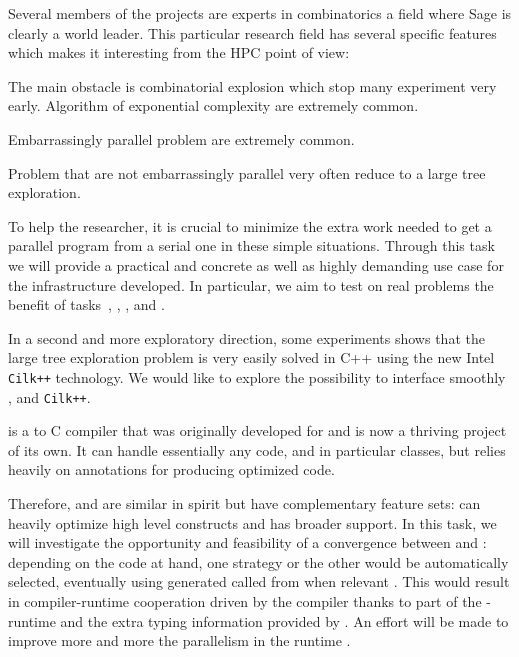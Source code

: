 \begin{workpackage}
\begin{tasklist}
\begin{task}[title=HPC infrastructure for combinatorics,id=hpc-combi]
  Several members of the projects are experts in combinatorics a field where
  Sage is clearly a world leader. This particular research field has several
  specific features which makes it interesting from the HPC point of view:
  \begin{compactitem}
  \item The main obstacle is combinatorial explosion which stop many
    experiment very early. Algorithm of exponential complexity are extremely
    common.
  \item Embarrassingly parallel problem are extremely common.
  \item Problem that are not embarrassingly parallel very often reduce to a
    large tree exploration.
  \end{compactitem}
  To help the researcher, it is crucial to minimize the extra work needed to
  get a parallel program from a serial one in these simple situations. Through
  this task we will provide a practical and concrete as well as highly
  demanding use case for the infrastructure developed. In particular, we aim
  to test on real problems the benefit of tasks~,
  , ,
  and .

  In a second and more exploratory direction, some experiments shows that the
  large tree exploration problem is very easily solved in C++ using the new
  Intel \texttt{Cilk++} technology. We would like to explore the possibility to
  interface smoothly \Pythran, \Cython and \texttt{Cilk++}.
\end{task}

\begin{task}[title=Pythran-Cython convergence,id=pythran-cython]

  \Cython is a \Python to C compiler that was originally developed for
  \Sage and is now a thriving project of its own. It can handle
  essentially any \Python code, and in particular classes, but relies
  heavily on annotations for producing optimized code.

  Therefore, \Pythran and \Cython are similar in spirit but have
  complementary feature sets: \Pythran can heavily optimize high level
  \Numpy constructs and \Cython has broader \Python support. In this
  task, we will investigate the opportunity and feasibility of a
  convergence between \Cython and \Pythran: depending on the code at
  hand, one strategy or the other would be automatically selected,
  eventually using \Pythran generated called from \Cython when
  relevant . This would result in compiler-runtime
  cooperation driven by the \Cython compiler thanks to part of the
  \Pythran-runtime and the extra typing information provided by \Cython. An
  effort will be made to improve more and more the parallelism in the
  \Pythran runtime .


\end{task}
\end{tasklist}
\end{workpackage}
